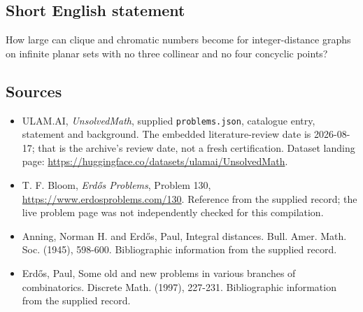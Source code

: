 \documentclass[11pt,a4paper]{article}
\begin{document}
\subsection{Short English statement}

How large can clique and chromatic numbers become for integer-distance graphs on infinite planar sets with no three collinear and no four concyclic points?

\subsection{Sources}

{\small

\begin{itemize}

\item[\hypertarget{source:statement:1}{S1}] ULAM.AI, \emph{UnsolvedMath}, supplied \texttt{problems.json}, catalogue entry, statement and background. The embedded literature-review date is 2026-08-17; that is the archive’s review date, not a fresh certification. Dataset landing page: \url{https://huggingface.co/datasets/ulamai/UnsolvedMath}.

\item[\hypertarget{source:statement:2}{S2}] T. F. Bloom, \emph{Erdős Problems}, Problem 130, \url{https://www.erdosproblems.com/130}. Reference from the supplied record; the live problem page was not independently checked for this compilation.

\item[\hypertarget{source:statement:3}{S3}] Anning, Norman H. and Erd\H{o}s, Paul, Integral distances. Bull. Amer. Math. Soc. (1945), 598-600. Bibliographic information from the supplied record.

\item[\hypertarget{source:statement:4}{S4}] Erd\H{o}s, Paul, Some old and new problems in various branches of combinatorics. Discrete Math. (1997), 227-231. Bibliographic information from the supplied record.

\end{itemize}

}

\label{end:statement}
\end{document}
